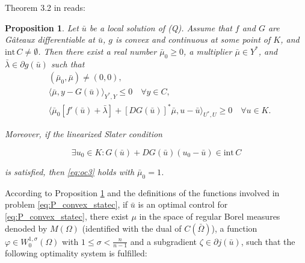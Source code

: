 \documentclass[11pt,a4paper]{amsart}
\newcommand{\om}{\Omega}
\newtheorem{proposition}{{Proposition}}
\begin{document}
Theorem 3.2 in \cite{Casas_2020} reads:
%
\begin{proposition}\label{prop:theorem32}
	 \textit{Let \( \bar{u} \) be a local solution of (Q). Assume that \( f \) and \( G \) are G\^ateaux differentiable at \( \bar{u} \), \( g \) is convex and continuous at some point of \( K \), and \( \text{int} \, C \neq \emptyset \). Then there exist a real number \( \bar{\mu}_0 \geq 0 \), a multiplier \( \bar{\mu} \in Y^* \), and \( \bar{\lambda} \in \partial g(\bar{u}) \) such that
}
\begin{subequations}
\begin{align}
&(\bar{\mu}_0, \bar{\mu}) \neq (0,0), \label{eq:oc1}\\
&\langle \bar{\mu}, y - G(\bar{u}) \rangle_{Y^*, Y} \leq 0 \quad \forall y \in C, \label{eq:oc2} \\
&\langle \bar{\mu}_0 [f'(\bar{u}) + \bar{\lambda}] + [DG(\bar{u})]^* \bar{\mu}, u - \bar{u} \rangle_{U^*, U} \geq 0 \quad \forall u \in K. \label{eq:oc3}
\end{align}
	
\end{subequations}


\textit{Moreover, if the linearized Slater condition
}

\[
\exists u_0 \in K : G(\bar{u}) + DG(\bar{u})(u_0 - \bar{u}) \in \text{int} \, C
\label{eq:oc4}
\]

\textit{is satisfied, then \eqref{eq:oc3} holds with \( \bar{\mu}_0 = 1 \).
}
\end{proposition}

According to Proposition \ref{prop:theorem32} and the definitions of the functions involved in problem \eqref{eq:P_convex_statec}, if $\bar u$ is an optimal control for \eqref{eq:P_convex_statec}, there exist $\mu$ in the space of regular Borel measures denoded by $M(\om)$ (identified with the dual of $C(\bar\om)$), a function $\varphi \in W_0^{1,\sigma}(\om)$ with $1\leq \sigma < \frac{n}{n-1}$ and a subgradient $\zeta \in \partial  j(\bar u)$, such that the following optimality system is fulfilled:
\end{document}
